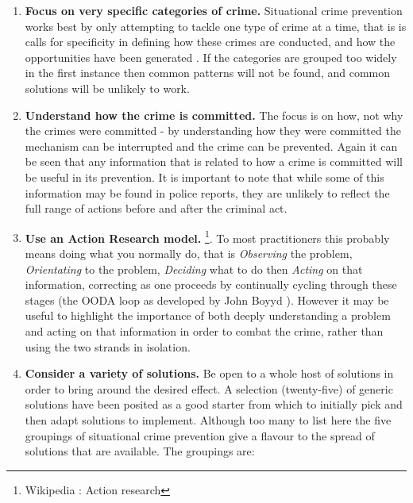 \begin{enumerate}

\item{\bf{Focus on very specific categories of crime.}} Situational crime prevention works best by only attempting to tackle one type of crime at a time, that is is calls for specificity in defining how these crimes are conducted, and how the opportunities have been generated \parencite{felson1998opportunity}. If the categories are grouped too widely in the first instance then common patterns will not be found, and common solutions will be unlikely to work.

\item{\bf{Understand how the crime is committed.}} The focus is on how, not why the crimes were committed - by understanding how they were committed the mechanism can be interrupted and the crime can be prevented. Again it can be seen that any information that is related to how a crime is committed will be useful in its prevention. It is important to note that while some of this information may be found in police reports, they are unlikely to reflect the full range of actions before and after the criminal act.

\item{\bf{Use an Action Research model.}}  \footnote{Wikipedia : Action research}. To most practitioners this probably means doing what you normally do, that is  \emph{Observing} the problem, \emph{Orientating} to the problem, \emph{Deciding} what to do then \emph{Acting} on that information, correcting as one proceeds by continually cycling through these stages (the OODA loop as developed by John Boyyd \parencite{modernstrat}). However it may be useful to highlight the importance of both deeply understanding a problem and acting on that information in order to combat the crime, rather than using the two strands in isolation.

\item{\bf{Consider a variety of solutions.}} Be open to a whole host of solutions in order to bring around the desired effect. A selection (twenty-five) of generic solutions have been posited as a good starter from which to initially pick and then adapt solutions to implement. Although too many to list here the five groupings of situational crime prevention give a flavour to the spread of solutions that are available. The groupings are:


\end{enumerate}
